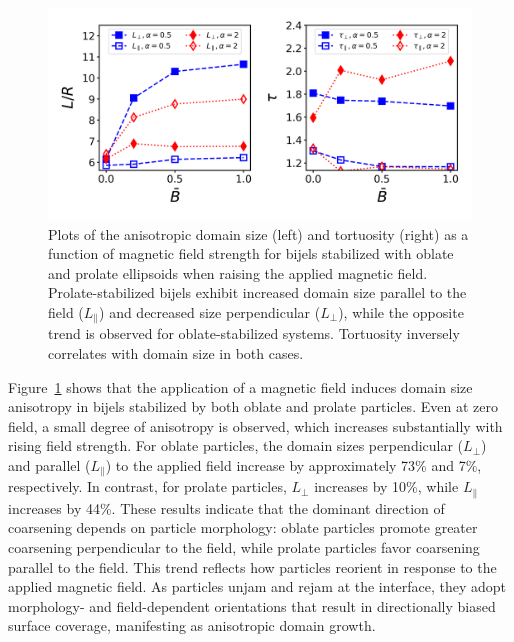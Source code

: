 \begin{figure} 
    \centering 
    \includegraphics[scale=0.6]{../figures/results/paper2/domain_size_aniso-field_on.png} 
    \caption{Plots of the anisotropic domain size (left) and tortuosity (right) as a function of magnetic field strength for bijels 
             stabilized with oblate and prolate ellipsoids when raising the applied magnetic field. Prolate-stabilized bijels 
             exhibit increased domain size parallel to the field ($L_{\parallel}$) and decreased size perpendicular ($L_{\perp}$), 
             while the opposite trend is observed for oblate-stabilized systems. Tortuosity inversely correlates with domain size in 
             both cases.} 
    \label{fig:domain_size_aniso-field_on} 
\end{figure}

Figure~\ref{fig:domain_size_aniso-field_on} shows that the application of a magnetic field induces domain size anisotropy in bijels stabilized by both oblate 
and prolate particles. Even at zero field, a small degree of anisotropy is observed, which increases substantially with rising field strength. For oblate particles, 
the domain sizes perpendicular (\(L_\perp\)) and parallel (\(L_\parallel\)) to the applied field increase by approximately 73\% and 7\%, respectively. In contrast, 
for prolate particles, \(L_\perp\) increases by 10\%, while \(L_\parallel\) increases by 44\%. These results indicate that the dominant direction of coarsening 
depends on particle morphology: oblate particles promote greater coarsening perpendicular to the field, while prolate particles favor coarsening parallel to the 
field. This trend reflects how particles reorient in response to the applied magnetic field. As particles unjam and rejam 
at the interface, they adopt morphology- and field-dependent orientations that result in directionally biased surface coverage, manifesting as anisotropic domain 
growth.

